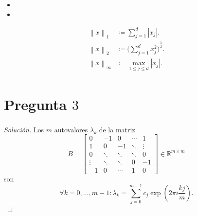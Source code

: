 \documentclass[aspectratio=1610,spanish,8pt]{beamer}
\begin{document}
\begin{frame}
    \frametitle{\secname}

    \begin{itemize}
        \item

              

        \item

              
    \end{itemize}

    \begin{definition}
        \begin{align*}
            \left\|x\right\|_{1}      & \coloneqq
            \sum_{j=1}^{d}\left|x_{j}\right|.                  \\
            \left\|x\right\|_{2}      & \coloneqq
            {\Big(\sum_{j=1}^{d}x^{2}_{j}\Big)}^{\frac{1}{2}}. \\
            \left\|x\right\|_{\infty} & \coloneqq
            \max_{1\leq j\leq d}\left|x_{j}\right|.            \\
        \end{align*}
    \end{definition}
\end{frame}

\section{Pregunta $3$}

\begin{frame}
    \frametitle{\secname}

    
\end{frame}

\begin{frame}
    \begin{proof}[Solución]
        Los $m$ autovalores $\lambda_{k}$ de la matriz
        \begin{equation*}
            B=
            \begin{bmatrix}
                0      & -1     & 0      & \cdots & 1      \\
                1      & 0      & -1     & \ddots & \vdots \\
                0      & \ddots & \ddots & \ddots & 0      \\
                \vdots & \ddots & \ddots & 0      & -1     \\
                -1     & 0      & \cdots & 1      & 0
            \end{bmatrix}\in\mathbb{R}^{m\times m}
        \end{equation*}
        son
        \begin{equation*}
            \forall k=0,\dotsc,m-1:
            \lambda_{k}=
            \sum_{j=0}^{m-1}
            c_{j}
            \exp
            \left(
            2\pi i\frac{kj}{m}
            \right).
        \end{equation*}
    \end{proof}
\end{frame}

\begin{frame}
\end{frame}
\end{document}
